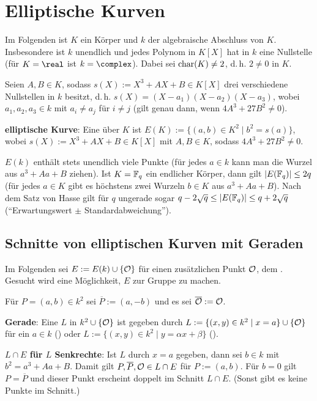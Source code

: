 \chapter{%
    Elliptische Kurven%
}

Im Folgenden ist $K$ ein Körper und $k$ der algebraische Abschluss von $K$.
Insbesondere ist $k$ unendlich und jedes Polynom in $K[X]$ hat in $k$ eine Nullstelle
(für $K = \real$ ist $k = \complex$).
Dabei sei $\operatorname{char}(K) \not= 2$, d.\,h. $2 \not= 0$ in $K$.

Seien $A, B \in K$, sodass $s(X) := X^3 + AX + B \in K[X]$ drei verschiedene Nullstellen in $k$
besitzt, d.\,h. $s(X) = (X - a_1)(X - a_2)(X - a_3)$, wobei $a_1, a_2, a_3 \in k$
mit $a_i \not= a_j$ für $i \not= j$ (gilt genau dann, wenn $4A^3 + 27B^2 \not= 0$).

\textbf{elliptische Kurve}:
Eine  über $K$ ist
$E(K) := \{(a, b) \in K^2 \;|\; b^2 = s(a)\}$,
wobei $s(X) := X^3 + AX + B \in K[X]$ mit $A, B \in K$, sodass $4A^3 + 27B^2 \not= 0$.

$E(k)$ enthält stets unendlich viele Punkte
(für jedes $a \in k$ kann man die Wurzel aus $a^3 + Aa + B$ ziehen).
Ist $K = \mathbb{F}_q$ ein endlicher Körper, dann gilt $|E(\mathbb{F}_q)| \le 2q$
(für jedes $a \in K$ gibt es höchstens zwei Wurzeln $b \in K$ aus $a^3 + Aa + B$).
Nach dem Satz von Hasse gilt für $q$ ungerade sogar
$q - 2\sqrt{q} \le |E(\mathbb{F}_q)| \le q + 2\sqrt{q}$
("`Erwartungswert $\pm$ Standardabweichung"').

\section{%
    Schnitte von elliptischen Kurven mit Geraden%
}

Im Folgenden sei $E := E(k) \cup \{\mathcal{O}\}$ für einen zusätzlichen Punkt $\mathcal{O}$,
dem .
Gesucht wird eine Möglichkeit, $E$ zur Gruppe zu machen.

Für $P = (a, b) \in k^2$ sei $\overline{P} := (a, -b)$ und es sei $\overline{\mathcal{O}} := \mathcal{O}$.

\textbf{Gerade}:
Eine  $L$ in $k^2 \cup \{\mathcal{O}\}$ ist gegeben durch
$L := \{(x, y) \in k^2 \;|\; x = a\} \cup \{\mathcal{O}\}$ für ein $a \in k$ () oder
$L := \{(x, y) \in k^2 \;|\; y = \alpha x + \beta\}$ ().

\linie

\textbf{$L \cap E$ für $L$ Senkrechte}:
Ist $L$ durch $x = a$ gegeben, dann sei $b \in k$ mit $b^2 = a^3 + Aa + B$.
Damit gilt $P, \overline{P}, \mathcal{O} \in L \cap E$ für $P := (a, b)$.
Für $b = 0$ gilt $P = \overline{P}$ und dieser Punkt erscheint doppelt im Schnitt $L \cap E$.
(Sonst gibt es keine Punkte im Schnitt.)

